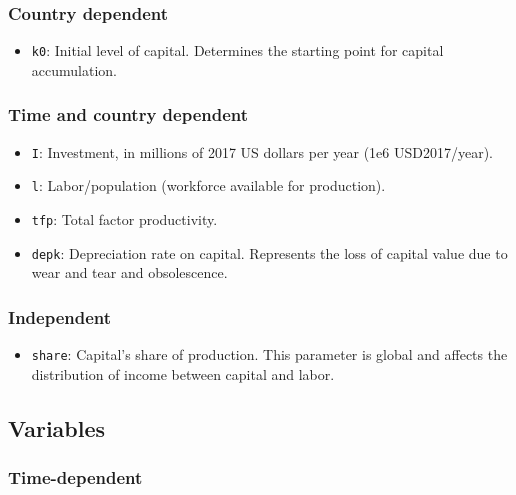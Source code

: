 \documentclass[
]{article}
\providecommand{\tightlist}{%
  \setlength{\itemsep}{0pt}\setlength{\parskip}{0pt}}
\begin{document}
\subsubsection{Country dependent}\label{country-dependent-1}

\begin{itemize}
\tightlist
\item
  \texttt{k0}: Initial level of capital. Determines the starting point
  for capital accumulation.
\end{itemize}

\subsubsection{Time and country
dependent}\label{time-and-country-dependent-6}

\begin{itemize}
\item
  \texttt{I}: Investment, in millions of
  2017 US dollars per year (1e6 USD2017/year).
\item
  \texttt{l}: Labor/population (workforce available for production).
\item
  \texttt{tfp}: Total factor productivity.
\item
  \texttt{depk}: Depreciation rate on capital. Represents the loss of
  capital value due to wear and tear and obsolescence.
\end{itemize}

\subsubsection{Independent}\label{independent-2}

\begin{itemize}
\tightlist
\item
  \texttt{share}: Capital's share of production. This parameter is
  global and affects the distribution of income between capital and
  labor.
\end{itemize}

\subsection{Variables}\label{variables-3}

\subsubsection{Time-dependent}\label{time-dependent-4}
\end{document}

